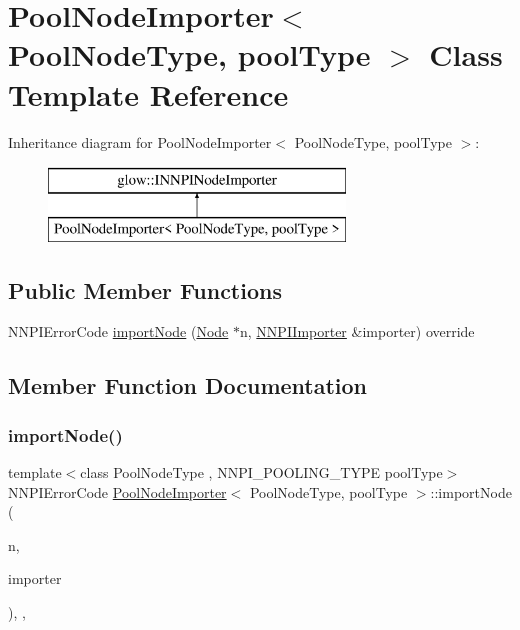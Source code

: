 \hypertarget{class_pool_node_importer}{}\section{Pool\+Node\+Importer$<$ Pool\+Node\+Type, pool\+Type $>$ Class Template Reference}
\label{class_pool_node_importer}
Inheritance diagram for Pool\+Node\+Importer$<$ Pool\+Node\+Type, pool\+Type $>$\+:\begin{figure}[H]
\begin{center}
\leavevmode
\includegraphics[height=2.000000cm]{class_pool_node_importer}
\end{center}
\end{figure}
\subsection*{Public Member Functions}
\begin{DoxyCompactItemize}
\item 
N\+N\+P\+I\+Error\+Code \hyperlink{class_pool_node_importer_a0c3544fc147b689ca5d3d6cc00cc26bf}{import\+Node} (\hyperlink{classglow_1_1_node}{Node} $\ast$n, \hyperlink{classglow_1_1_n_n_p_i_importer}{N\+N\+P\+I\+Importer} \&importer) override
\end{DoxyCompactItemize}


\subsection{Member Function Documentation}
\mbox{\label{class_pool_node_importer_a0c3544fc147b689ca5d3d6cc00cc26bf}} 
\subsubsection{\texorpdfstring{import\+Node()}{importNode()}}
{\footnotesize\ttfamily template$<$class Pool\+Node\+Type , N\+N\+P\+I\+\_\+\+P\+O\+O\+L\+I\+N\+G\+\_\+\+T\+Y\+PE pool\+Type$>$ \\
N\+N\+P\+I\+Error\+Code \hyperlink{class_pool_node_importer}{Pool\+Node\+Importer}$<$ Pool\+Node\+Type, pool\+Type $>$\+::import\+Node (\begin{DoxyParamCaption}\item[{\hyperlink{classglow_1_1_node}{Node} $\ast$}]{n,  }\item[{\hyperlink{classglow_1_1_n_n_p_i_importer}{N\+N\+P\+I\+Importer} \&}]{importer }\end{DoxyParamCaption})\hspace{0.3cm}{\ttfamily [inline]}, {\ttfamily [override]}, {\ttfamily [virtual]}}

